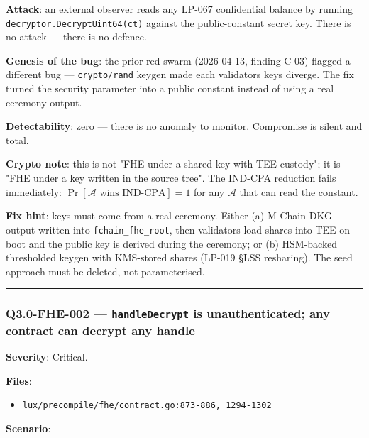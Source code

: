 \documentclass[
]{article}
\providecommand{\tightlist}{%
  \setlength{\itemsep}{0pt}\setlength{\parskip}{0pt}}
\begin{document}
\textbf{Attack}: an external observer reads any LP-067 confidential
balance by running \texttt{decryptor.DecryptUint64(ct)} against the
public-constant secret key. There is no attack --- there is no defence.

\textbf{Genesis of the bug}: the prior red swarm (2026-04-13, finding
C-03) flagged a different bug --- \texttt{crypto/rand} keygen made each
validator\textquotesingle s keys diverge. The fix turned the security
parameter into a public constant instead of using a real ceremony
output.

\textbf{Detectability}: zero --- there is no anomaly to monitor.
Compromise is silent and total.

\textbf{Crypto note}: this is not "FHE under a shared key with TEE
custody"; it is "FHE under a key written in the source tree". The
IND-CPA reduction fails immediately:
\(\Pr[\mathcal{A}\text{ wins IND-CPA}] = 1\) for any \(\mathcal{A}\)
that can read the constant.

\textbf{Fix hint}: keys must come from a real ceremony. Either (a)
M-Chain DKG output written into \texttt{fchain\_fhe\_root}, then
validators load shares into TEE on boot and the public key is derived
during the ceremony; or (b) HSM-backed thresholded keygen with
KMS-stored shares (LP-019 §LSS resharing). The seed approach must be
deleted, not parameterised.

\begin{center}\rule{0.5\linewidth}{0.5pt}\end{center}

\subsubsection{\texorpdfstring{Q3.0-FHE-002 --- \texttt{handleDecrypt}
is unauthenticated; any contract can decrypt any
handle}{Q3.0-FHE-002 --- handleDecrypt is unauthenticated; any contract can decrypt any handle}}\label{q30-fhe-002--handledecrypt-is-unauthenticated-any-contract-can-decrypt-any-handle}

\textbf{Severity}: Critical.

\textbf{Files}:

\begin{itemize}
\tightlist
\item
  \texttt{lux/precompile/fhe/contract.go:873-886,\ 1294-1302}
\end{itemize}

\textbf{Scenario}:
\end{document}
